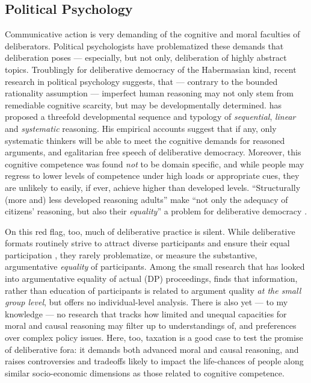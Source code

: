 
\subsection{Political Psychology}
Communicative action is very demanding of the cognitive and moral faculties of deliberators.
Political psychologists have problematized these demands that deliberation poses \citep{Rosenberg-2002-aa} --- especially, but not only, deliberation of highly abstract topics.
Troublingly for deliberative democracy of the Habermasian kind, recent research in political psychology suggests, that --- contrary to the bounded rationality assumption \citep[for example,][]{Simon-1999-aa,Kahneman2011} --- imperfect human reasoning may not only stem from remediable cognitive scarcity, but may be developmentally determined. 
\citet{Rosenberg-2002-aa} has proposed a threefold developmental sequence and typology of \emph{sequential}, \emph{linear} and \emph{systematic} reasoning. %
His empirical accounts suggest that if any, only systematic thinkers will be able to meet the cognitive demands for reasoned arguments, and egalitarian free speech of deliberative democracy. 
Moreover, this cognitive competence was found \emph{not} to be domain specific, and while people may regress to lower levels of competence under high loads or appropriate cues, they are unlikely to easily, if ever, achieve higher than developed levels. 
``Structurally (more and) less developed reasoning adults'' make ``not only the adequacy of citizens' reasoning, but also their \emph{equality}'' a problem for deliberative democracy \citep[12, emphasis added]{Rosenberg-2007-aa}.

On this red flag, too, much of deliberative practice is silent. 
While deliberative formats routinely strive to attract diverse participants and ensure their equal participation \citep{Fishkin2009}, they rarely problematize, or measure the substantive, argumentative \emph{equality} of participants. 
Among the small research that has looked into argumentative equality of actual (\gls{DP}) proceedings, \cite{Siu} finds that information, rather than education of participants is related to argument quality \emph{at the small group level}, but offers no individual-level analysis. 
There is also yet --- to my knowledge --- no research that tracks how limited and unequal capacities for moral and causal reasoning may filter up to understandings of, and preferences over complex policy issues.
Here, too, taxation is a good case to test the promise of deliberative fora: it demands both advanced moral and causal reasoning, and raises controversies and tradeoffs likely to impact the life-chances of people along similar socio-economic dimensions as those related to cognitive competence.

